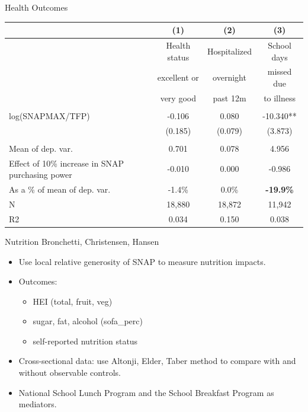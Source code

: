 \documentclass{beamer}
\begin{document}
\begin{frame}
\begin{table}{Health Outcomes}%

\begin{adjustbox}{max width=\textwidth}
  \centering
      \begin{tabular}{lccc}
    \toprule
          & (1)   & (2)   & (3) \\
    \midrule
          & Health status & Hospitalized & School days \\
          & excellent or & overnight & missed due \\
          & very good & past 12m & to illness \\
          &       &       &  \\
    log(SNAPMAX/TFP) & -0.106 & 0.080 & -10.340** \\
          & (0.185) & (0.079) & (3.873) \\
          &       &       &  \\
    Mean of dep. var. & 0.701 & 0.078 & 4.956 \\
    Effect of 10\% increase in SNAP purchasing power & -0.010 & 0.000 & -0.986 \\
    As a \% of mean of dep. var. & -1.4\% & 0.0\% & \textbf{-19.9\%} \\
    N     & 18,880 & 18,872 & 11,942 \\
    R2    & 0.034 & 0.150 & 0.038 \\
    \bottomrule
\end{tabular}
\end{adjustbox}
\end{table}
\end{frame}

\begin{frame}{Nutrition}
 Bronchetti, Christensen, Hansen
\begin{itemize}
\item Use local relative generosity of SNAP to measure nutrition impacts.
\item Outcomes: 
\begin{itemize}
\item HEI (total, fruit, veg)
\item sugar, fat, alcohol (sofa\_perc)
\item self-reported nutrition status
\end{itemize}
\item Cross-sectional data: use Altonji, Elder, Taber method to compare with and without observable controls.
\item National School Lunch Program and the School Breakfast Program as mediators.
\end{itemize}

\end{frame}
\end{document}
